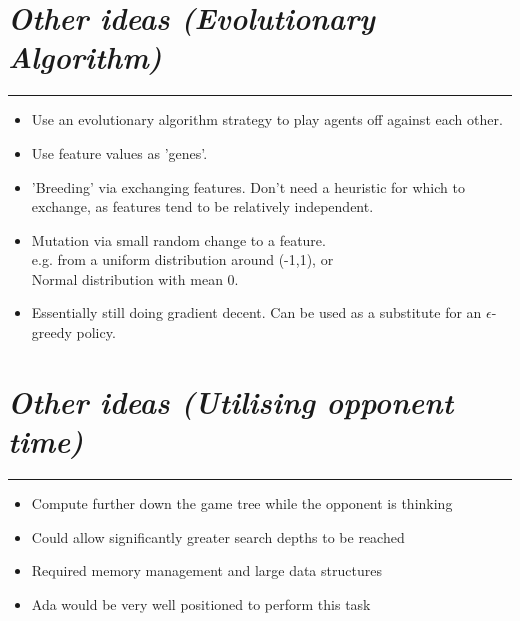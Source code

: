 \documentclass[10pt]{report}
\begin{document}
\section*{\emph{Other ideas (Evolutionary Algorithm)}}
\hrule
    \begin{itemize}
  \item
   	Use an evolutionary algorithm strategy to play agents off against each other.
  \item
	Use feature values as 'genes'.
  \item
	'Breeding' via exchanging features. Don't need a heuristic for which to exchange, as features tend to be relatively independent.
  \item
	Mutation via small random change to a feature.
	\\ e.g. from a uniform distribution around (-1,1), or
	\\ Normal distribution with mean 0.
  \item
	Essentially still doing gradient decent. Can be used as a substitute for an $\epsilon$-greedy policy.
  \end{itemize}

\section*{\emph{Other ideas (Utilising opponent time)}}
\hrule
    \begin{itemize}
  \item
   	Compute further down the game tree while the opponent is thinking
  \item
	Could allow significantly greater search depths to be reached
  \item
	Required memory management and large data structures
  \item
	Ada would be very well positioned to perform this task
  \end{itemize}
\end{document}
